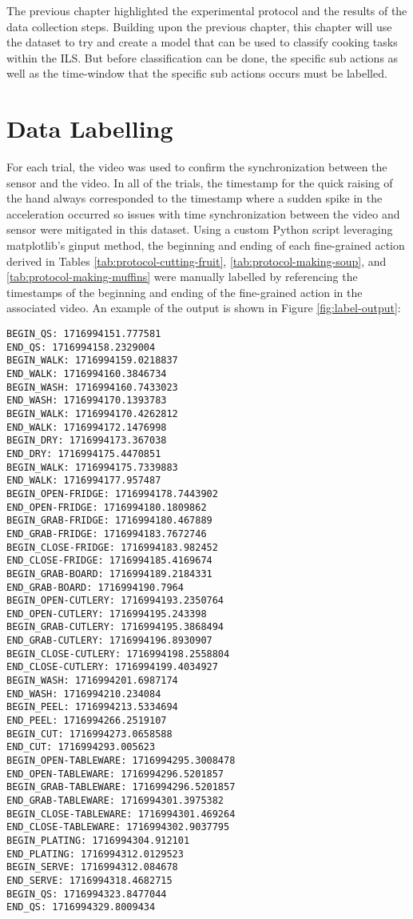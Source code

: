 

The previous chapter highlighted the experimental protocol and the results of the data collection steps. Building upon the previous chapter, this chapter will use the dataset to try and create a model that can be used to classify cooking tasks within the ILS. But before classification can be done, the specific sub actions as well as the time-window that the specific sub actions occurs must be labelled. 

\section{Data Labelling}
For each trial, the video was used to confirm the synchronization between the sensor and the video. In all of the trials, the timestamp for the quick raising of the hand always corresponded to the timestamp where a sudden spike in the acceleration occurred so issues with time synchronization between the video and sensor were mitigated in this dataset. Using a custom Python script leveraging matplotlib's ginput method, the beginning and ending of each fine-grained action derived in Tables \ref{tab:protocol-cutting-fruit}, \ref{tab:protocol-making-soup}, and \ref{tab:protocol-making-muffins} were manually labelled by referencing the timestamps of the beginning and ending of the fine-grained action in the associated video. An example of the output is shown in Figure \ref{fig:label-output}:

\begin{lstlisting}[label=fig:label-output, caption=Manual labelling output for the cutting fruit task.]
BEGIN_QS: 1716994151.777581
END_QS: 1716994158.2329004
BEGIN_WALK: 1716994159.0218837
END_WALK: 1716994160.3846734
BEGIN_WASH: 1716994160.7433023
END_WASH: 1716994170.1393783
BEGIN_WALK: 1716994170.4262812
END_WALK: 1716994172.1476998
BEGIN_DRY: 1716994173.367038
END_DRY: 1716994175.4470851
BEGIN_WALK: 1716994175.7339883
END_WALK: 1716994177.957487
BEGIN_OPEN-FRIDGE: 1716994178.7443902
END_OPEN-FRIDGE: 1716994180.1809862
BEGIN_GRAB-FRIDGE: 1716994180.467889
END_GRAB-FRIDGE: 1716994183.7672746
BEGIN_CLOSE-FRIDGE: 1716994183.982452
END_CLOSE-FRIDGE: 1716994185.4169674
BEGIN_GRAB-BOARD: 1716994189.2184331
END_GRAB-BOARD: 1716994190.7964
BEGIN_OPEN-CUTLERY: 1716994193.2350764
END_OPEN-CUTLERY: 1716994195.243398
BEGIN_GRAB-CUTLERY: 1716994195.3868494
END_GRAB-CUTLERY: 1716994196.8930907
BEGIN_CLOSE-CUTLERY: 1716994198.2558804
END_CLOSE-CUTLERY: 1716994199.4034927
BEGIN_WASH: 1716994201.6987174
END_WASH: 1716994210.234084
BEGIN_PEEL: 1716994213.5334694
END_PEEL: 1716994266.2519107
BEGIN_CUT: 1716994273.0658588
END_CUT: 1716994293.005623
BEGIN_OPEN-TABLEWARE: 1716994295.3008478
END_OPEN-TABLEWARE: 1716994296.5201857
BEGIN_GRAB-TABLEWARE: 1716994296.5201857
END_GRAB-TABLEWARE: 1716994301.3975382
BEGIN_CLOSE-TABLEWARE: 1716994301.469264
END_CLOSE-TABLEWARE: 1716994302.9037795
BEGIN_PLATING: 1716994304.912101
END_PLATING: 1716994312.0129523
BEGIN_SERVE: 1716994312.084678
END_SERVE: 1716994318.4682715
BEGIN_QS: 1716994323.8477044
END_QS: 1716994329.8009434
\end{lstlisting}